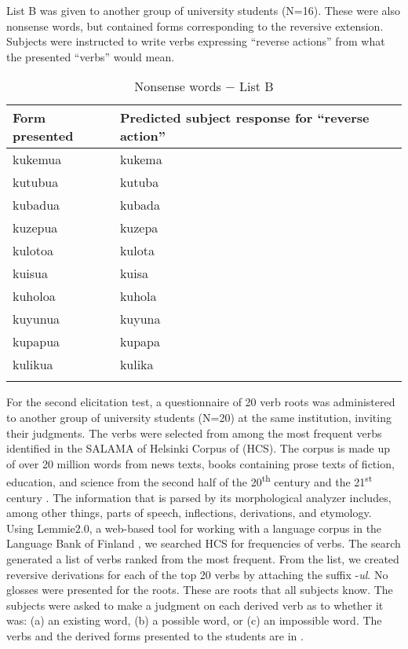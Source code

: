 \documentclass[output=paper]{langsci/langscibook}
\begin{document}
List B  was given to another group of university students (N=16). These were also nonsense words, but contained forms corresponding to the reversive extension. Subjects were instructed to write verbs expressing “reverse actions” from what the presented “verbs” would mean.

\begin{table}
\begin{tabularx}{.66\textwidth}{lX}
\lsptoprule
Form presented & Predicted subject response 
\newline for “reverse action”\\
\midrule
{kukemua} & {kukema}\\
{kutubua} & {kutuba}\\
{kubadua} & {kubada}\\
{kuzepua} & {kuzepa}\\
{kulotoa} & {kulota}\\
{kuisua} & {kuisa}\\
{kuholoa} & {kuhola}\\
{kuyunua} & {kuyuna}\\
{kupapua} & {kupapa}\\
{kulikua} & {kulika}\\
\lspbottomrule
\end{tabularx}
\caption{Nonsense words $-$ List B}
\label{tab:ngonyaningowa:2}
\end{table}

\largerpage
For the second elicitation test, a questionnaire of 20 verb roots was administered to another group of university students (N=20) at the same institution, inviting their judgments. The verbs were selected from among the most frequent  verbs identified in the SALAMA of Helsinki Corpus of  (HCS). The corpus is made up of over 20 million words from news texts, books containing prose texts of fiction, education, and science from the second half of the 20\textsuperscript{th} century and the 21\textsuperscript{st} century \citep{Hurskainen2008,Hurskainen2009}. The information that is parsed by its morphological analyzer includes, among other things, parts of speech, inflections, derivations, and etymology. Using Lemmie2.0, a web-based tool for working with a language corpus in the Language Bank of Finland \citep{CSC2003}, we searched HCS for frequencies of verbs. The search generated a list of verbs ranked from the most frequent. From the list, we created reversive derivations for each of the top 20 verbs by attaching the suffix -\textit{ul}. No glosses were presented for the roots. These are roots that all subjects know. The subjects were asked to make a judgment on each derived verb as to whether it was: (a) an existing word, (b) a possible word, or (c) an impossible word. The verbs and the derived forms presented to the students are in .
\end{document}
